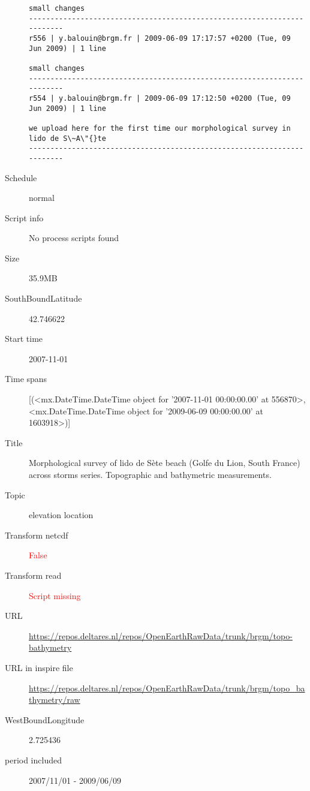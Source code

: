 \documentclass[9]{report}
\begin{document}
\begin{description}
\begin{verbatim}
small changes
------------------------------------------------------------------------
r556 | y.balouin@brgm.fr | 2009-06-09 17:17:57 +0200 (Tue, 09 Jun 2009) | 1 line

small changes
------------------------------------------------------------------------
r554 | y.balouin@brgm.fr | 2009-06-09 17:12:50 +0200 (Tue, 09 Jun 2009) | 1 line

we upload here for the first time our morphological survey in lido de S\~A\"{}te
------------------------------------------------------------------------

\end{verbatim}
  \item[Schedule] normal
  \item[Script info] No process scripts found
  \item[Size] 35.9MB
  \item[SouthBoundLatitude] 42.746622
  \item[Start time] 2007-11-01
  \item[Time spans] [(<mx.DateTime.DateTime object for '2007-11-01 00:00:00.00' at 556870>, <mx.DateTime.DateTime object for '2009-06-09 00:00:00.00' at 1603918>)]
  \item[Title]  Morphological survey of lido de S\`ete beach (Golfe du Lion, South France) across storms series. Topographic and bathymetric measurements. 
  \item[Topic] elevation location
  \item[Transform netcdf] \textcolor{red}{False}
  \item[Transform read] \textcolor{red}{Script missing}
  \item[URL] \href{https://repos.deltares.nl/repos/OpenEarthRawData/trunk/brgm/topo-bathymetry}{https://repos.deltares.nl/repos/OpenEarthRawData/trunk/brgm/topo-bathymetry}
  \item[URL in inspire file] \href{https://repos.deltares.nl/repos/OpenEarthRawData/trunk/brgm/topo\_bathymetry/raw}{https://repos.deltares.nl/repos/OpenEarthRawData/trunk/brgm/topo\_bathymetry/raw}
  \item[WestBoundLongitude] 2.725436
  \item[period included] 2007/11/01 - 2009/06/09
\end{description}
\end{document}
